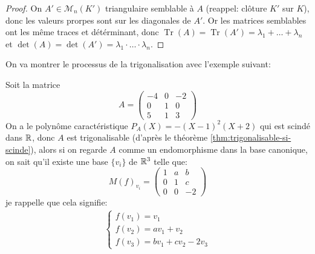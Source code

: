 \begin{proof}
    On $A' \in \mathcal{M}_n(K')$ triangulaire semblable à $A$ (reappel: clôture $K'$ sur  $K$), donc les valeurs prorpes sont sur les diagonales de $A'$. Or les matrices semblables ont les même traces et détérminant, donc $\operatorname{Tr}(A) = \operatorname{Tr}(A') = \lambda_1 + \ldots + \lambda_n$ et $\det(A) = \det(A') = \lambda_1 \cdot \ldots \cdot \lambda_n$.
\end{proof}

On va montrer le processus de la trigonalisation avec l'exemple suivant:

\begin{eg}
   Soit la matrice 
   \[
   A = \begin{pmatrix}
       -4 & 0 & -2 \\
       0 & 1 & 0\\
       5 & 1 & 3
   \end{pmatrix}
   \] 
   On a le polynôme caractéristique $P_A(X) = -(X - 1)^2(X + 2)$ qui est scindé dans $\mathbb{R}$, donc $A$ est trigonalisable (d'après le théorème \ref{thm:trigonalisable-si-scinde}), alors si on regarde $A$ comme un endomorphisme dans la base canonique, on sait qu'il existe une base  $\{v_i\}$ de  $\mathbb{R}^3$ telle que:
   \[
       M(f)_{v_i} = \begin{pmatrix} 
           1 & a & b\\
           0 & 1 & c\\
           0 & 0 & -2
       \end{pmatrix} 
   \] 
   je rappelle que cela signifie:
   \begin{align}\label{eq:trigon-example-system}
       \begin{cases}
           f(v_1) = v_1\\
           f(v_2) = a v_1 + v_2\\
           f(v_3) = b v_1 + c v_2 - 2 v_3
       \end{cases}
    \end{align}


\end{eg}
